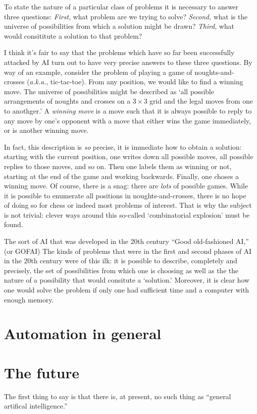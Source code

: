 \documentclass[10pt, a4paper, twocolumn]{article}
\begin{document}
To state the nature of a particular class of problems it is necessary to answer
three questions: \emph{First,} what problem are we trying to solve?
\emph{Second,} what is the universe of possibilities from which a solution might
be drawn? \emph{Third,} what would consititute a solution to that problem?

I think it's fair to say that the problems which have so far been successfully
attacked by AI turn out to have very precise answers to these three
questions. By way of an example, consider the problem of playing a game of
noughts-and-crosses (\emph{a.k.a.}, tic-tac-toe). From any position, we would
like to find a winning move. The universe of possibilities might be described as
`all possible arrangements of noughts and crosses on a $3\times3$ grid and the legal
moves from one to anothger.' A \emph{winning move} is a move such that it is
always possible to reply to any move by one's opponent with a move that either
wins the game immediately, or is another winning move.

In fact, this description is \emph{so} precise, it is immediate how to obtain a
solution: starting with the current position, one writes down all possible
moves, all possible replies to those moves, and so on. Then one labels them as
winning or not, starting at the end of the game and working backwards. Finally,
one choses a winning move. Of course, there is a snag: there are \emph{lots} of
possible games. While it is possible to enumerate all positions in
noughts-and-crosses, there is no hope of doing so for chess or indeed most
problems of interest. That is why the subject is not trivial: clever ways around
this so-called `combinatorial explosion' must be found.
 
The sort of AI that was developed in the 20th century ``Good old-fashioned AI,''
(or GOFAI) The kinds of problems that were in the first and second phases of AI
in the 20th century were of this ilk: it is possible to describe, completely and
precisely, the set of possibilities from which one is choosing as well as the
the nature of a possibility that would consitute a `solution.'  Moreover, it is
clear how one would solve the problem if only one had sufficient time and a
computer with enough memory.








\section{Automation in general}

\section{The future}

The first thing to say is that there is, at present, no such thing as ``general
artifical intelligence.''
\end{document}
